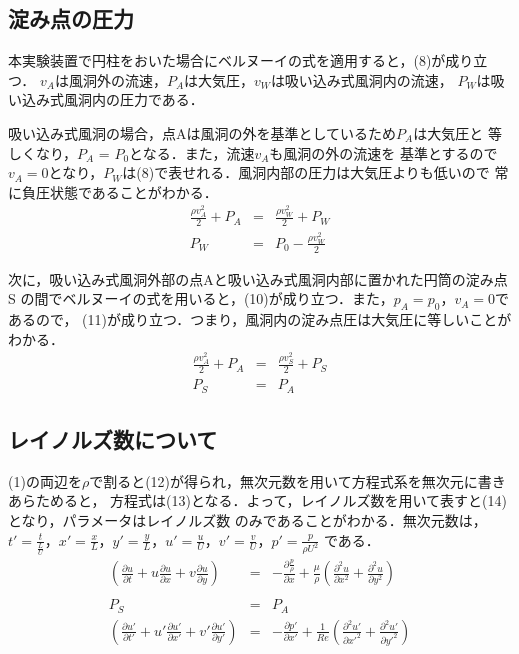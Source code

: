 \documentclass[twocolumn,10pt,a4j]{jsarticle}
\begin{document}
  \subsection{淀み点の圧力}
    本実験装置で円柱をおいた場合にベルヌーイの式を適用すると，(8)が成り立つ．
    $v_{A}$は風洞外の流速，$P_{A}$は大気圧，$v_{W}$は吸い込み式風洞内の流速，
    $P_{W}$は吸い込み式風洞内の圧力である．
    \par 吸い込み式風洞の場合，点Aは風洞の外を基準としているため$P_{A}$は大気圧と
    等しくなり，$P_{A}$ = $P_{0}$となる．また，流速$v_{A}$も風洞の外の流速を
    基準とするので$v_{A}=0$となり，$P_{W}$は(8)で表せれる．風洞内部の圧力は大気圧よりも低いので
    常に負圧状態であることがわかる．
    \begin{eqnarray}
      \frac{\rho v_{A}^2}{2} + P_{A} &=& \frac{\rho v_{W}^2}{2} + P_{W} \\
      P_{W} &=&P_{0} -  \frac{\rho v_{W}^2}{2}
    \end{eqnarray}
    \par 次に，吸い込み式風洞外部の点Aと吸い込み式風洞内部に置かれた円筒の淀み点S
    の間でベルヌーイの式を用いると，(10)が成り立つ．また，$p_{A} = p_{0}$，$v_{A}=0$であるので，
    (11)が成り立つ．つまり，風洞内の淀み点圧は大気圧に等しいことがわかる．
    \begin{eqnarray}
      \frac{\rho v_{A}^2}{2} + P_{A} &=& \frac{\rho v_{S}^2}{2} + P_{S} \\
      P_{S} &=&P_{A}
    \end{eqnarray}
  \subsection{レイノルズ数について}
    (1)の両辺を$\rho$で割ると(12)が得られ，無次元数を用いて方程式系を無次元に書きあらためると，
    方程式は(13)となる．よって，レイノルズ数を用いて表すと(14)となり，パラメータはレイノルズ数
    のみであることがわかる．無次元数は，\\
    $t' = \frac{t}{\frac{L}{U}}， x'=\frac{x}{L}， y'=\frac{y}{L}， u'=\frac{u}{U}， v'=\frac{v}{U}， p'=\frac{p}{\rho U^2}$
    である．
      \begin{eqnarray}
        \left( \frac{\partial u}{\partial t} + u\frac{\partial u}{\partial x} + v\frac{\partial u}{\partial y} \right) &=& - \frac{\partial \frac{p}{\rho}}{\partial x} + \frac{\mu}{\rho} \left( \frac{\partial^2 u}{\partial x^2} + \frac{\partial^2 u}{\partial y^2} \right) \nonumber \\
        \\
        P_{S} &=&P_{A} \\
        \left( \frac{\partial u'}{\partial t'} + u'\frac{\partial u'}{\partial x'} + v'\frac{\partial u'}{\partial y'} \right) &=& - \frac{\partial p'}{\partial x'} + \frac{1}{Re} \left( \frac{\partial^2 u'}{\partial x'^2} + \frac{\partial^2 u'}{\partial y'^2} \right) \nonumber \\
      \end{eqnarray}
\end{document}

